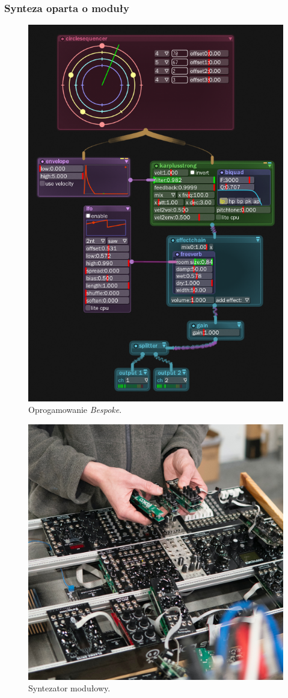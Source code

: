 \documentclass[]{beamer}
\begin{document}
\begin{frame}
  \frametitle {Synteza oparta o moduły}

  \begin{multicols}{2}
  \begin{figure}
    \centering
    \includegraphics[width=0.6\linewidth]{bespoke.png}
    \caption{Oprogamowanie \textit{Bespoke}.}
  \end{figure}

  \begin{figure}
    \centering
    \includegraphics[width=0.9\linewidth]{modular-synth.jpg}
    \caption{Syntezator modułowy.}
  \end{figure}
  \end{multicols}
\end{frame}
\end{document}
